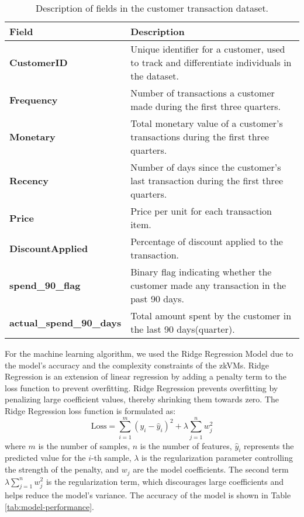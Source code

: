\documentclass{scrartcl}
\begin{document}
\begin{table}[ht!]
	\centering
	\begin{tabular}{|l|p{10cm}|}
		\hline
		\textbf{Field}                   & \textbf{Description}                                                                          \\
		\hline
		\textbf{CustomerID}              & Unique identifier for a customer, used to track and differentiate individuals in the dataset. \\
		\hline
		\textbf{Frequency}               & Number of transactions a customer made during the first three quarters.                       \\
		\hline
		\textbf{Monetary}                & Total monetary value of a customer's transactions during the first three quarters.            \\
		\hline
		\textbf{Recency}                 & Number of days since the customer's last transaction during the first three quarters.         \\
		\hline
		\textbf{Price}                   & Price per unit for each transaction item.                                                     \\
		\hline
		\textbf{DiscountApplied}         & Percentage of discount applied to the transaction.                                            \\
		\hline
		\textbf{spend\_90\_flag}         & Binary flag indicating whether the customer made any transaction in the past 90 days.         \\
		\hline
		\textbf{actual\_spend\_90\_days} & Total amount spent by the customer in the last 90 days(quarter).                              \\
		\hline
	\end{tabular}
	\caption{Description of fields in the customer transaction dataset.}
	\label{tab:dataset_description}
\end{table}

For the machine learning algorithm, we used the Ridge Regression Model due to the model's accuracy and the complexity constraints of the zkVMs. Ridge Regression is an extension of linear regression by adding a penalty term to the loss function to prevent overfitting.  Ridge Regression prevents overfitting by penalizing large coefficient values, thereby shrinking them towards zero. The Ridge Regression loss function is formulated as:
\[
	\text{Loss} = \sum_{i=1}^{m} \left( y_i - \hat{y}_i \right)^2 + \lambda \sum_{j=1}^{n} w_j^2
\]
where \( m \) is the number of samples, \( n \) is the number of features, \( \hat{y}_i \) represents the predicted value for the \( i \)-th sample, \( \lambda \) is the regularization parameter controlling the strength of the penalty, and \( w_j \) are the model coefficients. The second term \( \lambda \sum_{j=1}^{n} w_j^2 \) is the regularization term, which discourages large coefficients and helps reduce the model's variance. The accuracy of the model is shown in Table \ref{tab:model-performance}.
\end{document}
